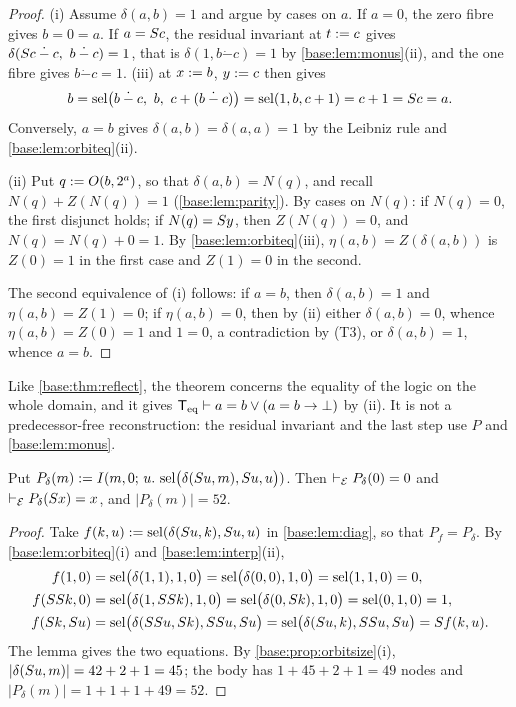 \begin{proof}
(i) Assume $\delta(a,b)=1$ and argue by cases on $a$.  If $a=0$, the
zero fibre gives $b=0=a$.  If $a=S c$, the residual invariant at
$t\mathrel{:=} c$ gives $\delta(\Suc c\mathbin{\dot-}c,\ b\mathbin{\dot-}c)=1$,
that is $\delta(1,b\mathbin{\dot-}c)=1$ by \cref{base:lem:monus}(ii), and
the one fibre gives $b\mathbin{\dot-}c=1$.  (iii) at
$x\mathrel{:=} b$, $y\mathrel{:=} c$ then gives
\[
 b=\sel\bigl(b\mathbin{\dot-}c,\ b,\ c+(b\mathbin{\dot-}c)\bigr)
  =\sel(1,b,c+1)=c+1=\Suc c=a .
\]
Conversely, $a=b$ gives $\delta(a,b)=\delta(a,a)=1$ by the Leibniz rule and
\cref{base:lem:orbiteq}(ii).

(ii) Put $q\mathrel{:=} O(b,2^{a})$, so that $\delta(a,b)=N(q)$, and recall
$N(q)+Z(N(q))=1$ (\cref{base:lem:parity}).  By cases on $N(q)$: if
$N(q)=0$, the first disjunct holds; if $N(q)=S y$, then
$Z(N(q))=0$, and $N(q)=N(q)+0=1$.  By \cref{base:lem:orbiteq}(iii),
$\eta(a,b)=Z(\delta(a,b))$ is $Z(0)=1$ in the first case and $Z(1)=0$ in
the second.

The second equivalence of (i) follows: if $a=b$, then $\delta(a,b)=1$ and
$\eta(a,b)=Z(1)=0$; if $\eta(a,b)=0$, then by (ii) either $\delta(a,b)=0$,
whence $\eta(a,b)=Z(0)=1$ and $1=0$, a contradiction by (T3), or
$\delta(a,b)=1$, whence $a=b$.
\end{proof}

Like \cref{base:thm:reflect}, the theorem concerns the equality of the logic
on the whole domain, and it gives $\mathsf{T}_{\mathrm{eq}}\vdash a=b\vee(a=b\to\bot)$ by
(ii).  It is not a predecessor-free reconstruction: the residual invariant
and the last step use $P$ and \cref{base:lem:monus}.

\begin{corollary}
\label{base:cor:pdelta}
Put $P_\delta(m)\mathrel{:=}I(m,0;\,u.\,\operatorname{sel}\bigl(\delta(S u,m),S u,u\bigr))$.
Then $\vdash_{\mathcal E}P_\delta(0)=0$ and
$\vdash_{\mathcal E}P_\delta(S x)=x$, and $|P_\delta(m)|=52$.
\end{corollary}

\begin{proof}
Take $f(k,u)\mathrel{:=}\operatorname{sel}(\delta(S u,k),S u,u)$ in
\cref{base:lem:diag}, so that $P_f=P_\delta$.  By
\cref{base:lem:orbiteq}(i) and \cref{base:lem:interp}(ii),
\begin{align*}
 f(1,0)&=\operatorname{sel}\bigl(\delta(1,1),1,0\bigr)=\operatorname{sel}\bigl(\delta(0,0),1,0\bigr)=\operatorname{sel}(1,1,0)=0,\\
 f(SS k,0)&=\operatorname{sel}\bigl(\delta(1,SS k),1,0\bigr)
  =\operatorname{sel}\bigl(\delta(0,S k),1,0\bigr)=\operatorname{sel}(0,1,0)=1,\\
 f(S k,S u)&=\operatorname{sel}\bigl(\delta(SS u,S k),SS u,S u\bigr)
  =\operatorname{sel}\bigl(\delta(S u,k),SS u,S u\bigr)=S f(k,u).
\end{align*}
The lemma gives the two equations.  By \cref{base:prop:orbitsize}(i),
$|\delta(S u,m)|=42+2+1=45$; the body has $1+45+2+1=49$ nodes and
$|P_\delta(m)|=1+1+1+49=52$.
\end{proof}

